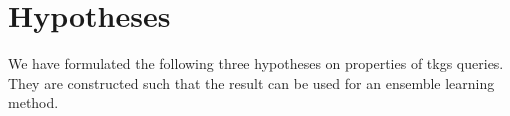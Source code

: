 \section{Hypotheses}
\label{sec:hypotheses}

We have formulated the following three hypotheses on properties of \glspl{tkg} queries.
They are constructed such that the result can be used for an ensemble learning method.

%

%

%

%